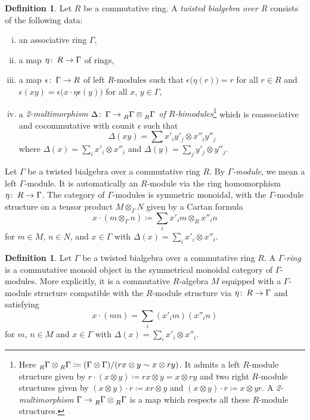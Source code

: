 \documentclass{gtpart}
\theoremstyle{definition}
\newtheorem{defn}[thm]{Definition}
\theoremstyle{remark}
\def\co{\colon\thinspace}
\newcommand{\G}{\Gamma}
\newcommand{\ce}{\coloneqq}
\numberwithin{equation}{section}
\numberwithin{thm}{section}
\begin{document}
\begin{defn}
\label{def:Gamma}
 Let $R$ be a commutative ring.  A {\em twisted bialgebra over $R$} 
 consists of the following data: 
 \begin{enumerate}[(i)]
  \item an associative ring $\G$, 

  \item a map $\eta \co R \to \G$ of rings, 

  \item a map $\epsilon \co \G \to R$ of left $R$-modules such that 
  $\epsilon \big( \eta(r) \big) = r$ for all $r \in R$ and 
  $\epsilon(xy) = \epsilon \big( x \cdot \eta \epsilon (y) \big)$ for 
  all $x$, $y \in \G$, 

  \item a {\em 2-multimorphism 
  $\Delta \co \G \to \prescript{}{R}\G \otimes \prescript{}{R}\G$ of 
  $R$-bimodules}\footnote{Here 
  $\prescript{}{R}\G \otimes \prescript{}{R}\G \ce 
  (\G \otimes \G) / (rx \otimes y \sim x \otimes ry)$.  It admits a left 
  $R$-module structure given by 
  $r \cdot (x \otimes y) \ce rx \otimes y = x \otimes ry$ and two right 
  $R$-module structures given by 
  $(x \otimes y) \cdot r \ce xr \otimes y$ and 
  $(x \otimes y) \cdot r \ce x \otimes yr$.  A {\em 2-multimorphism} 
  $\G \to \prescript{}{R}\G \otimes \prescript{}{R}\G$ is a map which 
  respects all these $R$-module structures.  } which is coassociative 
  and cocommutative with counit $\epsilon$ such that 
  \[
   \Delta(xy) = \sum x'_i y'_j \otimes x''_i y''_j 
  \]
  where $\Delta(x) = \sum_i x'_i \otimes x''_i$ and 
  $\Delta(y) = \sum_j y'_j \otimes y''_j$.  
 \end{enumerate}
\end{defn}

Let $\G$ be a twisted bialgebra over a commutative ring $R$.  By 
{\em $\G$-module}, we mean a left $\G$-module.  It is automatically an 
$R$-module via the ring homomorphism $\eta \co R \to \G$.  The category 
of $\G$-modules is symmetric monoidal, with the $\G$-module structure on 
a tensor product $M \otimes_\G N$ given by a Cartan formula 
\[
 x \cdot (m \otimes_\G n) \ce \sum_i x'_i m \otimes_R x''_i n 
\]
for $m \in M$, $n \in N$, and $x \in \G$ with 
$\Delta(x) = \sum_i x'_i \otimes x''_i$.  

\begin{defn}
 Let $\G$ be a twisted bialgebra over a commutative ring $R$.  A 
 {\em $\G$-ring} is a commutative monoid object in the symmetrical 
 monoidal category of $\G$-modules.  More explicitly, it is a 
 commutative $R$-algebra $M$ equipped with a $\G$-module structure 
 compatible with the $R$-module structure via $\eta \co R \to \G$ and 
 satisfying 
 \[
  x \cdot (mn) = \sum_i (x'_i m) (x''_i n) 
 \]
 for $m$, $n \in M$ and $x \in \G$ with 
 $\Delta(x) = \sum_i x'_i \otimes x''_i$.  
\end{defn}
\end{document}
